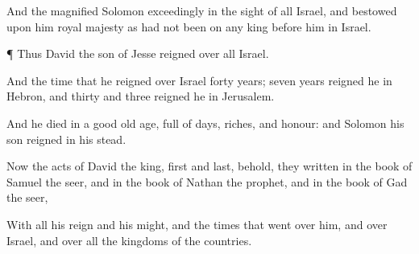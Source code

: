 {And the
{}
magnified
Solomon
exceedingly in the
sight of all
Israel, and
bestowed upon him
{}
royal
majesty as had not been on any
king
before him in
Israel.


\par }{\PP {}¶ Thus
David the
son of
Jesse
reigned over all
Israel.

And the
time that he
reigned over
Israel
{}
forty
years;
seven
years
reigned he in
Hebron, and
thirty and
three
{}
reigned he in
Jerusalem.

And he
died in a
good old
age,
full of
days,
riches, and
honour: and
Solomon his
son
reigned in his stead.

Now the
acts of
David the
king,
first and
last, behold, they
{}
written in the
book of
Samuel the
seer, and in the
book of
Nathan the
prophet, and in the
book of
Gad the
seer,

With all his
reign and his
might, and the
times that went
over him, and over
Israel, and over all the
kingdoms of the
countries.


\par }